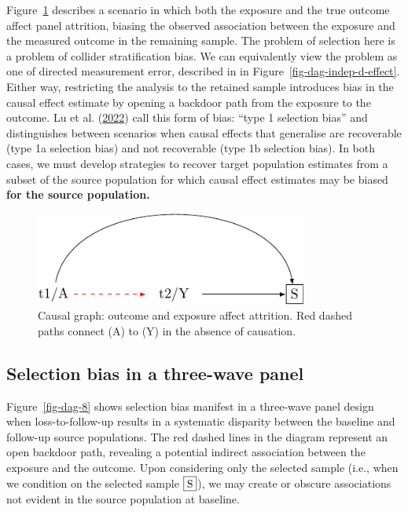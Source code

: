 \documentclass[
  singlecolumn]{report}
\begin{document}
Figure~\ref{fig-dag-8-5} describes a scenario in which both the exposure
and the true outcome affect panel attrition, biasing the observed
association between the exposure and the measured outcome in the
remaining sample. The problem of selection here is a problem of collider
stratification bias. We can equivalently view the problem as one of
directed measurement error, described in in
Figure~\ref{fig-dag-indep-d-effect}. Either way, restricting the
analysis to the retained sample introduces bias in the causal effect
estimate by opening a backdoor path from the exposure to the outcome. Lu
et al. (\protect\hyperlink{ref-lu2022}{2022}) call this form of bias:
``type 1 selection bias'' and distinguishes between scenarios when
causal effects that generalise are recoverable (type 1a selection bias)
and not recoverable (type 1b selection bias). In both cases, we must
develop strategies to recover target population estimates from a subset
of the source population for which causal effect estimates may be biased
\textbf{for the source population.}

\begin{figure}

{\centering \includegraphics[width=0.8\textwidth,height=\textheight]{causal-dags_files/figure-pdf/fig-dag-8-5-1.pdf}

}

\caption{\label{fig-dag-8-5}Causal graph: outcome and exposure affect
attrition. Red dashed paths connect (A) to (Y) in the absence of
causation.}

\end{figure}

\hypertarget{selection-bias-in-a-three-wave-panel}{%
\subsection{Selection bias in a three-wave
panel}\label{selection-bias-in-a-three-wave-panel}}

Figure~\ref{fig-dag-8} shows selection bias manifest in a three-wave
panel design when loss-to-follow-up results in a systematic disparity
between the baseline and follow-up source populations. The red dashed
lines in the diagram represent an open backdoor path, revealing a
potential indirect association between the exposure and the outcome.
Upon considering only the selected sample (i.e., when we condition on
the selected sample \(\framebox{S}\)), we may create or obscure
associations not evident in the source population at baseline.
\end{document}
